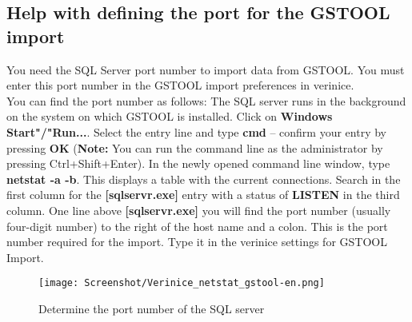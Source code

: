 \documentclass[a4paper,10pt]{book}
\begin{document}
\subsection{Help with defining the port for the GSTOOL import}
You need the SQL Server port number to import data from GSTOOL. You must enter this port number in the GSTOOL import
preferences in verinice.
\newline\\
You can find the port number as follows: The SQL server runs in the background on the system on which GSTOOL is installed.
Click on \textbf{Windows Start"/"Run...}. Select the entry line and type \textbf{cmd} – confirm your entry by pressing \textbf{OK}
(\textbf{Note:} You can run the command line as the administrator by pressing Ctrl+Shift+Enter). In the newly opened command
line window, type \textbf{netstat -a -b}. This displays a table with the current connections. Search in the first column for the
\textbf{[sqlservr.exe]} entry with a status of \textbf{LISTEN} in the third column. One line above
\textbf{[sqlservr.exe]} you will find the port number (usually four-digit number) to the right of the host name and a colon.
This is the port number required for the import. Type it in the verinice settings for GSTOOL Import.
\newline
\begin{figure}[htb!]
  \centering
  \texttt{[image: Screenshot/Verinice\_netstat\_gstool-en.png]}
  \caption{\label{Determine the port number of the SQL server} Determine the port number of the SQL server}
\end{figure}
\newline
\end{document}
